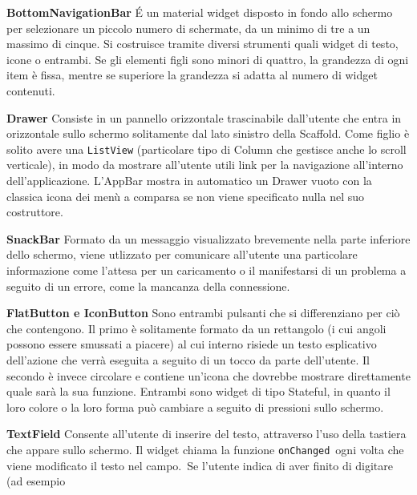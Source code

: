 \begin{trivlist}
		\item \textbf{BottomNavigationBar} \newline
		\'E un material widget disposto in fondo allo schermo per selezionare un
		piccolo numero di schermate, da un minimo di tre a un massimo di cinque.
		Si costruisce tramite diversi strumenti quali widget di testo, icone o
		entrambi. Se gli elementi figli sono minori di quattro, la grandezza di
		ogni item è fissa, mentre se superiore la grandezza si adatta al numero
		di widget contenuti.
		\item \textbf{Drawer} \newline
		Consiste in un pannello orizzontale trascinabile dall'utente che entra
		in orizzontale sullo schermo
		solitamente dal lato sinistro della Scaffold. Come figlio è solito avere
		una \texttt{ListView} (particolare tipo di Column che gestisce anche lo scroll
		verticale), in modo da mostrare all'utente utili link per la navigazione
		all'interno dell'applicazione. L'AppBar mostra in automatico un Drawer
		vuoto con la classica icona dei menù a comparsa se non viene specificato
		nulla nel suo costruttore.
		\item \textbf{SnackBar} \newline
		Formato da un messaggio visualizzato brevemente
		nella parte inferiore dello schermo, viene utlizzato per comunicare
		all'utente una particolare informazione come l'attesa per un caricamento
		o il manifestarsi di un problema a seguito di un errore, come la
		mancanza della connessione.
		\item \textbf{FlatButton e IconButton} \newline
		Sono entrambi pulsanti che si differenziano per ciò che contengono. Il
		primo è solitamente formato da un rettangolo (i cui angoli possono
		essere smussati a piacere) al cui interno risiede un testo esplicativo
		dell'azione che verrà eseguita a seguito di un tocco da parte
		dell'utente. Il secondo è invece circolare e contiene un'icona che
		dovrebbe mostrare direttamente quale sarà la sua funzione. Entrambi sono
		widget di tipo Stateful, in quanto il loro colore o la loro forma può
		cambiare a seguito di pressioni sullo schermo.
		\item \textbf{TextField} \newline
		Consente all'utente di inserire del testo, attraverso l'uso della
		tastiera che appare sullo schermo. Il widget chiama la funzione
		\texttt{onChanged} ogni volta che viene modificato il testo nel campo. Se
		l'utente indica di aver finito di digitare (ad esempio

\end{trivlist}
